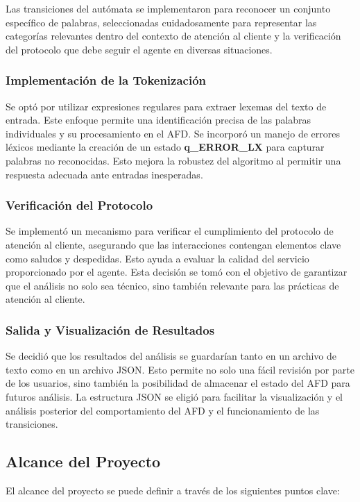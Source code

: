 \documentclass[12pt,a4paper]{scrartcl} %
\begin{document}
Las transiciones del autómata se implementaron para reconocer un conjunto específico de
palabras, seleccionadas cuidadosamente para representar las categorías relevantes dentro del
contexto de atención al cliente y la verificación del protocolo que debe seguir el agente en
diversas situaciones.

\subsubsection{Implementación de la Tokenización}
Se optó por utilizar expresiones regulares para extraer lexemas del texto de entrada. Este
enfoque permite una identificación precisa de las palabras individuales y su procesamiento en
el AFD. Se incorporó un manejo de errores léxicos mediante la creación de un estado
\textbf{q\_ERROR\_LX} para capturar palabras no reconocidas. Esto mejora la robustez del
algoritmo al permitir una respuesta adecuada ante entradas inesperadas.

\subsubsection{Verificación del Protocolo}
Se implementó un mecanismo para verificar el cumplimiento del protocolo de atención al cliente,
asegurando que las interacciones contengan elementos clave como saludos y despedidas. Esto
ayuda a evaluar la calidad del servicio proporcionado por el agente. Esta decisión se tomó con
el objetivo de garantizar que el análisis no solo sea técnico, sino también relevante para las
prácticas de atención al cliente.

\subsubsection{Salida y Visualización de Resultados}
Se decidió que los resultados del análisis se guardarían tanto en un archivo de texto como en
un archivo JSON. Esto permite no solo una fácil revisión por parte de los usuarios, sino
también la posibilidad de almacenar el estado del AFD para futuros análisis. La estructura JSON
se eligió para facilitar la visualización y el análisis posterior del comportamiento del AFD y
el funcionamiento de las transiciones.

\subsection{Alcance del Proyecto}
El alcance del proyecto se puede definir a través de los siguientes puntos clave:
\end{document}
